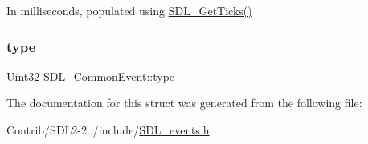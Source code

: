 In milliseconds, populated using \mbox{\hyperlink{_s_d_l__timer_8h_a0b9bc71d6287e0ffafdc3419760fe2b3}{S\+D\+L\+\_\+\+Get\+Ticks()}} \mbox{\label{struct_s_d_l___common_event_a4ecd888325355321b42b2e2956f27453}} 
\subsubsection{\texorpdfstring{type}{type}}
{\footnotesize\ttfamily \mbox{\hyperlink{_s_d_l__stdinc_8h_add440eff171ea5f55cb00c4a9ab8672d}{Uint32}} S\+D\+L\+\_\+\+Common\+Event\+::type}



The documentation for this struct was generated from the following file\+:\begin{DoxyCompactItemize}
\item 
Contrib/\+S\+D\+L2-\/2../include/\mbox{\hyperlink{_s_d_l__events_8h}{S\+D\+L\+\_\+events.\+h}}\end{DoxyCompactItemize}
